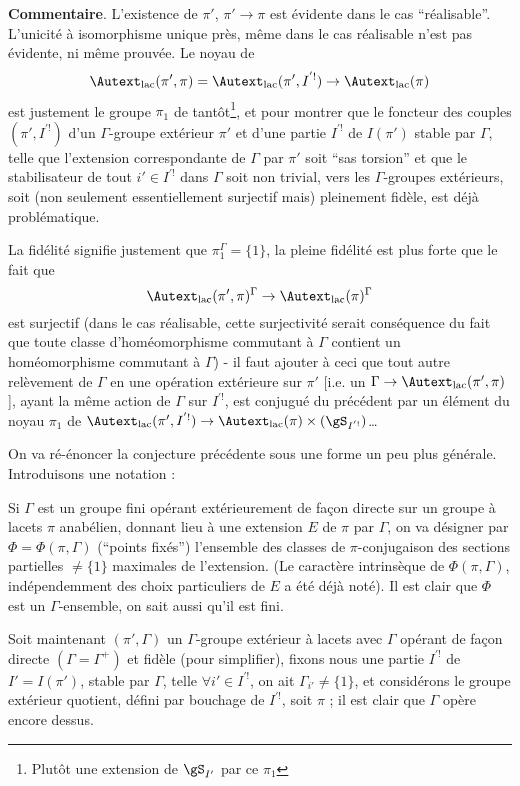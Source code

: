 {\bf Commentaire}. L'existence de $\pi'$, $\pi' \to \pi$ est évidente dans le cas ``réalisable''. L'unicité à isomorphisme unique près, même dans le cas réalisable n'est pas évidente, ni même prouvée. Le noyau de
$$
\Autext_{\text{lac}} (\pi', \pi) = \Autext_{\text{lac}} (\pi', I^{'!}) \to \Autext_{\text{lac}} (\pi)
$$
est justement le groupe $\pi_1$ de tantôt\footnote{Plutôt une extension de $\gS_{I'}$ par ce $\pi_1$}, et pour montrer que le foncteur des couples $(\pi', I^{'!})$ d'un $\Gamma$-groupe extérieur $\pi'$ et d'une partie $I^{'!}$ de $I(\pi')$ stable par $\Gamma$, telle que l'extension correspondante de $\Gamma$ par $\pi'$ soit ``sas torsion'' et que le stabilisateur de tout $i' \in I^{'!}$ dans $\Gamma$ soit non trivial, vers les $\Gamma$-groupes extérieurs, soit (non seulement essentiellement surjectif mais) pleinement fidèle, est déjà problématique.

La fidélité signifie justement que $\pi^{\Gamma}_1 = \{ 1 \}$, la pleine fidélité est plus forte que le fait que
$$
\Autext_{\text{lac}} (\pi', \pi)^\Gamma \to \Autext_{\text{lac}} (\pi)^\Gamma 
$$
est surjectif (dans le cas réalisable, cette surjectivité serait conséquence du fait que toute classe d'homéomorphisme commutant à $\Gamma$ contient un homéomorphisme commutant à $\Gamma$) - il faut ajouter à ceci que tout autre relèvement de $\Gamma$ en une opération extérieure sur $\pi'$ [i.e. un $\Gamma \to \Autext_{\text{lac}} (\pi', \pi)$], ayant la même action de $\Gamma$ sur $I^{'!}$, est conjugué du précédent par un élément du noyau $\pi_1$ de $\Autext_{\text{lac}}(\pi', I^{'!}) \to \Autext_{\text{lac}}(\pi) \times (\gS_{I^{'!}})$\dots 

On va ré-énoncer la conjecture précédente sous une forme un peu plus générale. Introduisons une notation :

Si $\Gamma$ est un groupe fini opérant extérieurement de fa\c{c}on directe sur un groupe à lacets $\pi$ anabélien, donnant lieu à une extension $E$ de $\pi$ par $\Gamma$, on va désigner par $\Phi = \Phi (\pi, \Gamma)$ (``points fixés'') l'ensemble des classes de $\pi$-conjugaison des sections partielles $\neq \{ 1 \}$ maximales de l'extension. (Le caractère intrinsèque de $\Phi(\pi, \Gamma)$, indépendemment des choix particuliers de $E$ a été déjà noté). Il est clair que $\Phi$ est un $\Gamma$-ensemble, on sait aussi qu'il est fini.

Soit maintenant $(\pi', \Gamma)$ un $\Gamma$-groupe extérieur à lacets avec $\Gamma$ opérant de fa\c{c}on directe $(\Gamma = \Gamma^+)$ et fidèle (pour simplifier), fixons nous une partie $I^{'!}$ de $I' = I(\pi')$, stable par $\Gamma$, telle $\forall i' \in I^{'!}$, on ait $\Gamma_{i'} \neq \{ 1 \}$, et considérons le groupe extérieur quotient, défini par bouchage de $I^{'!}$, soit $\pi$ ; il est clair que $\Gamma$ opère encore dessus.

